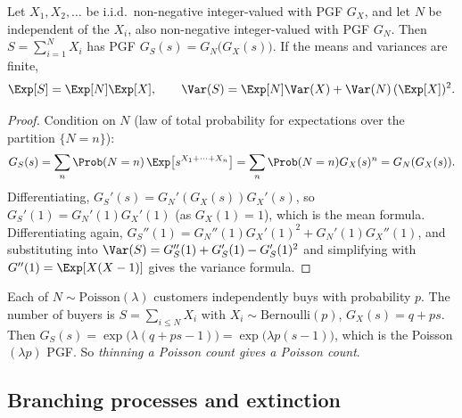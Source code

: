\begin{theorem}\label{thm:randomsum}
Let $X_1,X_2,\dots$ be i.i.d.\ non-negative integer-valued with PGF $G_X$, and let $N$ be
independent of the $X_i$, also non-negative integer-valued with PGF $G_N$. Then
$S=\sum_{i=1}^NX_i$ has PGF $G_S(s)=G_N\bigl(G_X(s)\bigr)$. If the means
and variances are finite,
\[
\Exp[S]=\Exp[N]\Exp[X],\qquad\Var(S)=\Exp[N]\Var(X)+\Var(N)\,(\Exp[X])^2.
\]
\end{theorem}
\begin{proof}
Condition on $N$ (law of total probability for expectations over the partition
$\{N=n\}$):
\[
G_S(s)=\sum_n\Prob(N=n)\,\Exp\bigl[s^{X_1+\dots+X_n}\bigr]=\sum_n\Prob(N=n)G_X(s)^n=G_N(G_X(s)).
\]
Differentiating, $G_S'(s)=G_N'(G_X(s))G_X'(s)$, so $G_S'(1)=G_N'(1)G_X'(1)$ (as
$G_X(1)=1$), which is the mean formula. Differentiating again,
$G_S''(1)=G_N''(1)G_X'(1)^2+G_N'(1)G_X''(1)$, and substituting into
$\Var(S)=G_S''(1)+G_S'(1)-G_S'(1)^2$ and simplifying with $G''(1)=\Exp[X(X-1)]$
gives the variance formula.
\end{proof}

\begin{example}
Each of $N\sim\mathrm{Poisson}(\lambda)$ customers independently buys with
probability $p$. The number of buyers is $S=\sum_{i\le N}X_i$ with
$X_i\sim\mathrm{Bernoulli}(p)$, $G_X(s)=q+ps$. Then
$G_S(s)=\exp\bigl(\lambda(q+ps-1)\bigr)=\exp\bigl(\lambda p(s-1)\bigr)$, which is the
Poisson$(\lambda p)$ PGF. So \emph{thinning a Poisson count gives a Poisson count}.
\end{example}

\subsection*{Branching processes and extinction}

